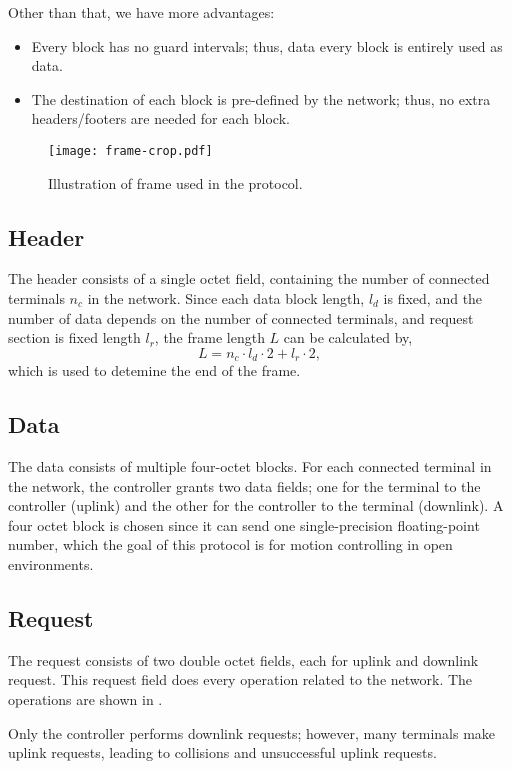 ﻿\documentclass[twocolumn,9pt]{ltjsarticle}
\renewcommand{\ref}{\Cref}
\begin{document}
Other than that, we have more advantages:
\begin{itemize}
\item Every block has no guard intervals; thus, data every block is entirely used as data.
\item The destination of each block is pre-defined by the network; thus, no extra headers/footers are needed for each block.
\end{itemize}

\begin{figure}[tb]
  \centering
  \texttt{[image: frame-crop.pdf]}
  \caption{\label{fig:frame}
    Illustration of frame used in the protocol.
  }
\end{figure}

\subsection{Header}
The header consists of a single octet field, containing the number of connected terminals $n_{c}$ in the network.
Since each data block length, $l_d$ is fixed, and the number of data depends on the number of connected terminals, and request section is fixed length $l_r$, the frame length $L$ can be calculated by,
\begin{equation}
  \label{}
  L = n_c \cdot l_d \cdot 2 + l_r \cdot 2,
\end{equation}
which is used to detemine the end of the frame.

\subsection{Data}
The data consists of multiple four-octet blocks.
For each connected terminal in the network, the controller grants two data fields; one for the terminal to the controller (uplink) and the other for the controller to the terminal (downlink).
A four octet block is chosen since it can send one single-precision floating-point number, which the goal of this protocol is for motion controlling in open environments.

\subsection{Request}
The request consists of two double octet fields, each for uplink and downlink request.
This request field does every operation related to the network.
The operations are shown in \ref{tab:request}.

Only the controller performs downlink requests; however, many terminals make uplink requests, leading to collisions and unsuccessful uplink requests.
\end{document}
